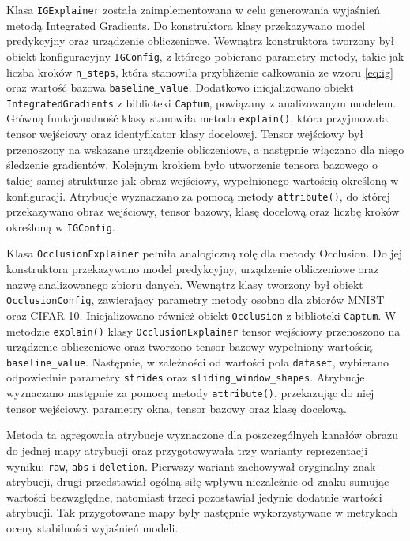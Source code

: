 Klasa \texttt{IGExplainer} została zaimplementowana w celu generowania wyjaśnień metodą Integrated Gradients. Do konstruktora klasy przekazywano model predykcyjny oraz urządzenie obliczeniowe. Wewnątrz konstruktora tworzony był obiekt konfiguracyjny \texttt{IGConfig}, z którego pobierano parametry metody, takie jak liczba kroków \texttt{n\_steps}, która stanowiła przybliżenie całkowania ze wzoru \ref{eq:ig} oraz wartość bazowa \texttt{baseline\_value}. Dodatkowo inicjalizowano obiekt \texttt{IntegratedGradients} z biblioteki \texttt{Captum}, powiązany z analizowanym modelem.
Główną funkcjonalność klasy stanowiła metoda \texttt{explain()}, która przyjmowała tensor wejściowy oraz identyfikator klasy docelowej. Tensor wejściowy był przenoszony na wskazane urządzenie obliczeniowe, a następnie włączano dla niego śledzenie gradientów. Kolejnym krokiem było utworzenie tensora bazowego o takiej samej strukturze jak obraz wejściowy, wypełnionego wartością określoną w konfiguracji. Atrybucje wyznaczano za pomocą metody \texttt{attribute()}, do której przekazywano obraz wejściowy, tensor bazowy, klasę docelową oraz liczbę kroków określoną w \texttt{IGConfig}.

Klasa \texttt{OcclusionExplainer} pełniła analogiczną rolę dla metody Occlusion. Do jej konstruktora przekazywano model predykcyjny, urządzenie obliczeniowe oraz nazwę analizowanego zbioru danych. Wewnątrz klasy tworzony był obiekt \texttt{OcclusionConfig}, zawierający parametry metody osobno dla zbiorów MNIST oraz CIFAR-10. Inicjalizowano również obiekt \texttt{Occlusion} z biblioteki \texttt{Captum}. W metodzie \texttt{explain()} klasy \texttt{OcclusionExplainer} tensor wejściowy przenoszono na urządzenie obliczeniowe oraz tworzono tensor bazowy wypełniony wartością \texttt{baseline\_value}. Następnie, w zależności od wartości pola \texttt{dataset}, wybierano odpowiednie parametry \texttt{strides} oraz \texttt{sliding\_window\_shapes}. Atrybucje wyznaczano następnie za pomocą metody \texttt{attribute()}, przekazując do niej tensor wejściowy, parametry okna, tensor bazowy oraz klasę docelową.

Metoda ta agregowała atrybucje wyznaczone dla poszczególnych kanałów obrazu do jednej mapy atrybucji oraz przygotowywała trzy warianty reprezentacji wyniku: \texttt{raw}, \texttt{abs} i \texttt{deletion}. Pierwszy wariant zachowywał oryginalny znak atrybucji, drugi przedstawiał ogólną siłę wpływu niezależnie od znaku sumując wartości bezwzględne, natomiast trzeci pozostawiał jedynie dodatnie wartości atrybucji. Tak przygotowane mapy były następnie wykorzystywane w metrykach oceny stabilności wyjaśnień modeli.

